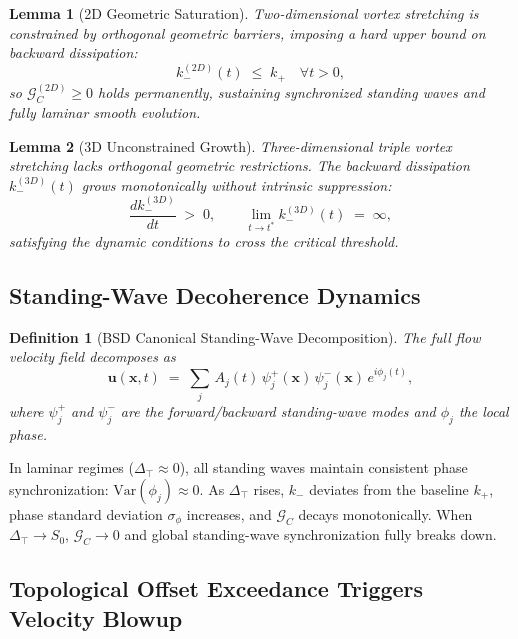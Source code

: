 \documentclass[11pt,a4paper]{article}
\newtheorem{lemma}{Lemma}
\newtheorem{definition}{Definition}
\theoremstyle{remark}
\newcommand{\kplus}{k_{+}}
\newcommand{\kminus}{k_{-}}
\newcommand{\Szero}{S_{0}}
\newcommand{\GC}{\mathcal{G}_{\!C}}
\newcommand{\Dtop}{\Delta_{\!\top}}
\newcommand{\uvec}{\bm{u}}
\begin{document}
\begin{lemma}[2D Geometric Saturation]\label{lem:2d}
Two-dimensional vortex stretching is constrained by orthogonal geometric barriers, imposing a hard upper bound on backward dissipation:
\begin{equation}\label{eq:2d-bound}
\kminus^{(2D)}(t) \;\le\; \kplus \quad\forall t>0,
\end{equation}
so $\GC^{(2D)}\ge 0$ holds permanently, sustaining synchronized standing waves and fully laminar smooth evolution.
\end{lemma}

\begin{lemma}[3D Unconstrained Growth]\label{lem:3d}
Three-dimensional triple vortex stretching lacks orthogonal geometric restrictions. The backward dissipation $\kminus^{(3D)}(t)$ grows monotonically without intrinsic suppression:
\begin{equation}\label{eq:3d-growth}
\frac{d\kminus^{(3D)}}{dt} \;>\; 0, \qquad \lim_{t\to t^{*}}\kminus^{(3D)}(t)\;=\;\infty,
\end{equation}
satisfying the dynamic conditions to cross the critical threshold.
\end{lemma}

\subsection{Standing-Wave Decoherence Dynamics}\label{sec:decoherence}

\begin{definition}[BSD Canonical Standing-Wave Decomposition]\label{def:swd}
The full flow velocity field decomposes as
\begin{equation}\label{eq:swd}
\uvec(\bm{x},t) \;=\; \sum_{j}\,A_{j}(t)\,\psi_{j}^{+}(\bm{x})\,\psi_{j}^{-}(\bm{x})\,e^{i\phi_{j}(t)},
\end{equation}
where $\psi_{j}^{+}$ and $\psi_{j}^{-}$ are the forward/backward standing-wave modes and $\phi_{j}$ the local phase.
\end{definition}

In laminar regimes ($\Dtop\approx 0$), all standing waves maintain consistent phase synchronization: $\mathrm{Var}(\phi_{j})\approx 0$. As $\Dtop$ rises, $\kminus$ deviates from the baseline $\kplus$, phase standard deviation $\sigma_{\phi}$ increases, and $\GC$ decays monotonically. When $\Dtop\to\Szero$, $\GC\to 0$ and global standing-wave synchronization fully breaks down.

\subsection{Topological Offset Exceedance Triggers Velocity Blowup}\label{sec:blowup}
\end{document}
